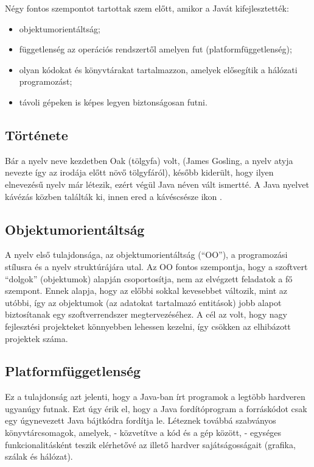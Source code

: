 \documentclass[a4paper,12pt]{report}
\begin{document}
\vspace{2mm}
Négy fontos szempontot tartottak szem előtt, amikor a Javát kifejlesztették:
\begin{itemize}
\item objektumorientáltság;
\item függetlenség az operációs rendszertől amelyen fut (platformfüggetlenség);
\item olyan kódokat és könyvtárakat tartalmazzon, amelyek elősegítik a hálózati programozást;
\item távoli gépeken is képes legyen biztonságosan futni.
\end{itemize}

\subsection{Története}
\label{javahistory}
\vspace{2mm}
Bár a nyelv neve kezdetben Oak (tölgyfa) volt, (James Gosling, a nyelv atyja nevezte így az irodája előtt növő tölgyfáról), később kiderült, hogy ilyen elnevezésű nyelv már létezik, ezért végül Java néven vált ismertté. A Java nyelvet kávézás közben találták ki, innen ered a kávéscsésze ikon \cite{javaname}.

\subsection{Objektumorientáltság}
\label{oo}

A nyelv első tulajdonsága, az objektumorientáltság (``OO''), a programozási stílusra és a nyelv struktúrájára utal. Az OO fontos szempontja, hogy a szoftvert ``dolgok'' (objektumok) alapján csoportosítja, nem az elvégzett feladatok a fő szempont. Ennek alapja, hogy az előbbi sokkal kevesebbet változik, mint az utóbbi, így az objektumok (az adatokat tartalmazó entitások) jobb alapot biztosítanak egy szoftverrendszer megtervezéséhez. A cél az volt, hogy nagy fejlesztési projekteket könnyebben lehessen kezelni, így csökken az elhibázott projektek száma.

\subsection{Platformfüggetlenség}
\label{platformfugg}

Ez a tulajdonság azt jelenti, hogy a Java-ban írt programok a legtöbb hardveren ugyanúgy futnak. Ezt úgy érik el, hogy a Java fordítóprogram a forráskódot csak egy úgynevezett Java bájtkódra fordítja le. Léteznek továbbá szabványos könyvtárcsomagok, amelyek, - közvetítve a kód és a gép között, - egységes funkcionalitásként teszik elérhetővé az illető hardver sajátságosságait (grafika, szálak és hálózat).
\end{document}
